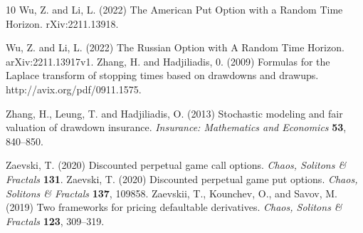\documentclass[10pt]{amsart}
\begin{document}
\begin{thebibliography}{10}
			 Wu, Z. and Li, L. (2022) The American Put Option with a Random Time Horizon. rXiv:2211.13918.
			
			 Wu, Z. and Li, L. (2022) The Russian Option with A Random Time Horizon. arXiv:2211.13917v1.
			Zhang, H. and Hadjiliadis, 0. (2009) Formulas for the Laplace transform of stopping times
			based on drawdowns and drawups. http://avix.org/pdf/0911.1575.
			
			Zhang, H., Leung, T. and Hadjiliadis, O. (2013) Stochastic modeling and fair valuation of drawdown insurance. {\it Insurance: Mathematics and Economics} {\bf 53}, 840--850.
			
			
			 Zaevski, T. (2020) Discounted perpetual game call options. {\it Chaos, Solitons \& Fractals} {\bf 131}.
			 Zaevski, T. (2020) Discounted perpetual game put options. {\it Chaos, Solitons \& Fractals} {\bf 137}, 109858.
			Zaevskii, T., Kounchev, O., and Savov, M. (2019)
			Two frameworks for pricing defaultable derivatives.
			{\it Chaos, Solitons \& Fractals} {\bf 123}, 309--319.
			
		\end{thebibliography}
		
		
		
	
\end{document}
